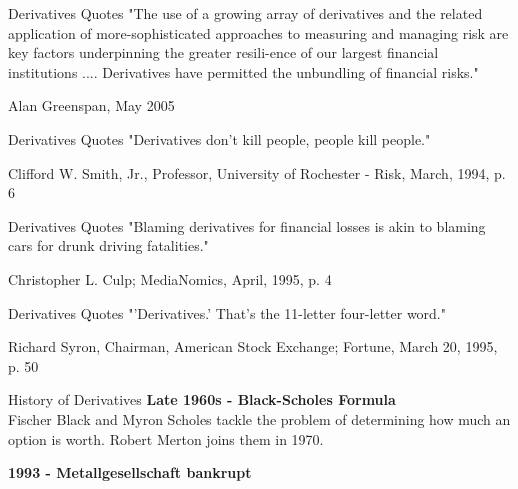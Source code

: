 {Derivatives Quotes}
"The use of a growing array of derivatives and the related application of more-sophisticated approaches to measuring and managing risk are key factors underpinning the greater resili-ence of our largest financial institutions .... Derivatives have permitted the unbundling of financial risks."
\begin{flushright}
  \begin{footnotesize}
  Alan Greenspan, May 2005
 \end{footnotesize}
\end{flushright}

{Derivatives Quotes}
"Derivatives don't kill people, people kill people."
\begin{flushright}
  \begin{footnotesize}
 Clifford W. Smith, Jr., Professor, University of Rochester - Risk, March, 1994, p. 6
 \end{footnotesize}
\end{flushright}

{Derivatives Quotes}
"Blaming derivatives for financial losses is akin to blaming cars for drunk driving fatalities."
\begin{flushright}
  \begin{footnotesize}
 Christopher L. Culp; MediaNomics, April, 1995, p. 4
 \end{footnotesize}
\end{flushright}

{Derivatives Quotes}
"'Derivatives.' That's the 11-letter four-letter word."
\begin{flushright}
  \begin{footnotesize}
  Richard Syron, Chairman, American Stock Exchange; Fortune, March 20, 1995, p. 50
 \end{footnotesize}
\end{flushright}

{History of Derivatives}
\textbf{Late 1960s - Black-Scholes Formula}\\






	Fischer Black and Myron Scholes tackle the problem of determining how much an option is worth. Robert Merton joins them in 1970.





\textbf{1993 - Metallgesellschaft bankrupt}


